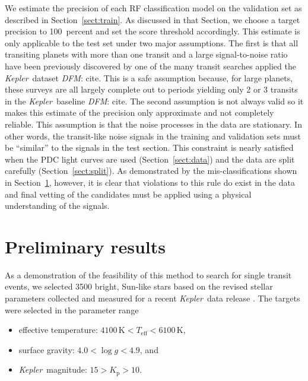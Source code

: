 \documentclass[12pt,preprint]{aastex}
\newcommand{\project}[1]{\textsl{#1}}
\newcommand{\kepler}{\project{Kepler}}
\newcommand{\sectionname}{Section}
\newcommand{\sectref}[1]{\ref{sect:#1}}
\newcommand{\Sect}[1]{\sectionname~\sectref{#1}}
\newcommand{\sect}[1]{\Sect{#1}}
\newcommand{\sectlabel}[1]{\label{sect:#1}}
\newcommand{\todo}[3]{{\color{#2}\emph{#1}: #3}}
\newcommand{\dfmtodo}[1]{\todo{DFM}{red}{#1}}
\begin{document}
We estimate the precision of each RF classification model on the validation
set as described in \sect{train}.
As discussed in that \sectionname, we choose a target precision to
100~percent and set the score threshold accordingly.
This estimate is only applicable to the test set under two major assumptions.
The first is that all transiting planets with more than one transit and a
large signal-to-noise ratio have been previously discovered by one of the many
transit searches applied the \kepler\ dataset \dfmtodo{cite}.
This is a safe assumption because, for large planets, these surveys are all
largely complete out to periods yielding only 2 or 3 transits in the \kepler\
baseline \dfmtodo{cite}.
The second assumption is not always valid so it makes this estimate of the
precision only approximate and not completely reliable.
This assumption is that the noise processes in the data are stationary.
In other words, the transit-like noise signals in the training and validation
sets must be ``similar'' to the signals in the test section.
This constraint is nearly satisfied when the PDC light curves are used
(\sect{data}) and the data are split carefully (\sect{split}).
As demonstrated by the mis-classifications shown in \sect{demo}, however, it
is clear that violations to this rule do exist in the data and final vetting
of the candidates must be applied using a physical understanding of the
signals.


\section{Preliminary results}\sectlabel{demo}

As a demonstration of the feasibility of this method to search for single
transit events, we selected 3500 bright, Sun-like stars based on the revised
stellar parameters collected and measured for a recent \kepler\ data release
\citep{Huber:2014}.
The targets were selected in the parameter range
\begin{itemize}

\item effective temperature:
        $4100\,\mathrm{K} < T_\mathrm{eff} < 6100\,\mathrm{K}$,

\item surface gravity:  $4.0 < \log g < 4.9$, and

\item \kepler\ magnitude: $15 > K_\mathrm{p} > 10$.

\end{itemize}
\end{document}
